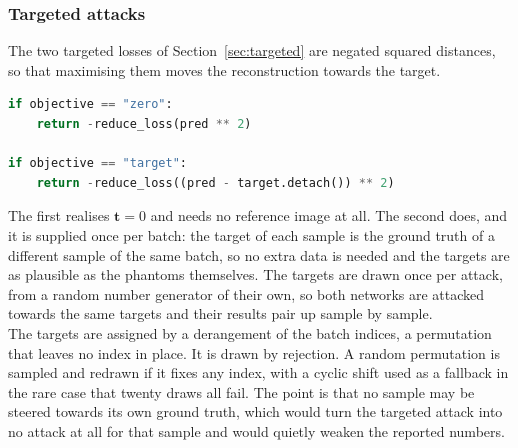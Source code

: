 \documentclass{article}
\numberwithin{equation}{section}
\begin{document}
\subsubsection{Targeted attacks}
The two targeted losses of Section~\ref{sec:targeted} are negated squared distances, so that
maximising them moves the reconstruction towards the target.
\begin{lstlisting}[language=Python, caption=The targeted objectives]
if objective == "zero":
    return -reduce_loss(pred ** 2)

if objective == "target":
    return -reduce_loss((pred - target.detach()) ** 2)
\end{lstlisting}
The first realises $\mathbf{t}=0$ and needs no reference image at all. The
second does, and it is supplied once per batch: the target of each sample is the
ground truth of a different sample of the same batch, so no extra data is needed
and the targets are as plausible as the phantoms themselves. The targets are drawn once per attack,
from a random number generator of their own, so both networks are attacked towards the same targets
and their results pair up sample by sample.\\
The targets are assigned by a derangement of the batch indices, a permutation
that leaves no index in place. It is drawn by rejection. A random permutation is
sampled and redrawn if it fixes any index, with a cyclic shift used as a
fallback in the rare case that twenty draws all fail. The point is that no sample
may be steered towards its own ground truth, which would turn the targeted
attack into no attack at all for that sample and would quietly weaken the
reported numbers.\\
\end{document}
